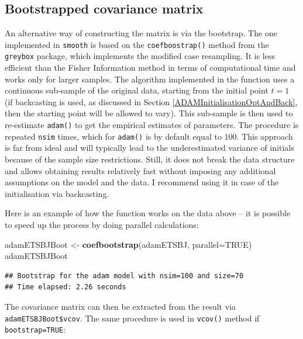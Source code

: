 \documentclass[]{book}
\newenvironment{Shaded}{\begin{snugshade}}{\end{snugshade}}
\newcommand{\DataTypeTok}[1]{\textcolor[rgb]{0.13,0.29,0.53}{#1}}
\newcommand{\KeywordTok}[1]{\textcolor[rgb]{0.13,0.29,0.53}{\textbf{#1}}}
\newcommand{\NormalTok}[1]{#1}
\newcommand{\OtherTok}[1]{\textcolor[rgb]{0.56,0.35,0.01}{#1}}
\newcommand{\StringTok}[1]{\textcolor[rgb]{0.31,0.60,0.02}{#1}}
\theoremstyle{definition}
\theoremstyle{definition}
\theoremstyle{definition}
\theoremstyle{definition}
\theoremstyle{remark}
\begin{document}
\hypertarget{bootstrapped-covariance-matrix}{%
\subsection{Bootstrapped covariance matrix}\label{bootstrapped-covariance-matrix}}

An alternative way of constructing the matrix is via the bootstrap. The one implemented in \texttt{smooth} is based on the \texttt{coefboostrap()} method from the \texttt{greybox} package, which implements the modified case resampling. It is less efficient than the Fisher Information method in terms of computational time and works only for larger samples. The algorithm implemented in the function uses a continuous sub-sample of the original data, starting from the initial point \(t=1\) (if backcasting is used, as discussed in Section \ref{ADAMInitialisationOptAndBack}, then the starting point will be allowed to vary). This sub-sample is then used to re-estimate \texttt{adam()} to get the empirical estimates of parameters. The procedure is repeated \texttt{nsim} times, which for \texttt{adam()} is by default equal to 100. This approach is far from ideal and will typically lead to the underestimated variance of initials because of the sample size restrictions. Still, it does not break the data structure and allows obtaining results relatively fast without imposing any additional assumptions on the model and the data. I recommend using it in case of the initialisation via backcasting.

Here is an example of how the function works on the data above -- it is possible to speed up the process by doing parallel calculations:

\begin{Shaded}
\begin{Highlighting}[]
\NormalTok{adamETSBJBoot <-}\StringTok{ }\KeywordTok{coefbootstrap}\NormalTok{(adamETSBJ, }\DataTypeTok{parallel=}\OtherTok{TRUE}\NormalTok{)}
\NormalTok{adamETSBJBoot}
\end{Highlighting}
\end{Shaded}

\begin{verbatim}
## Bootstrap for the adam model with nsim=100 and size=70
## Time elapsed: 2.26 seconds
\end{verbatim}

The covariance matrix can then be extracted from the result via \texttt{adamETSBJBoot\$vcov}. The same procedure is used in \texttt{vcov()} method if \texttt{bootstrap=TRUE}:
\end{document}
